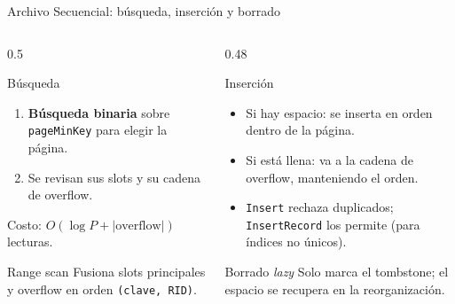 \documentclass[aspectratio=169,10pt]{beamer}
\begin{document}
\begin{frame}{Archivo Secuencial: búsqueda, inserción y borrado}
  \begin{columns}[T]
    \begin{column}{0.5\textwidth}
      \begin{block}{Búsqueda}
        \small
        \begin{enumerate}
          \item \textbf{Búsqueda binaria} sobre \texttt{pageMinKey} para elegir la página.
          \item Se revisan sus slots y su cadena de overflow.
        \end{enumerate}
        Costo: $O(\log P + |\text{overflow}|)$ lecturas.
      \end{block}
      \begin{block}{Range scan}
        \small Fusiona slots principales y overflow en orden \texttt{(clave, RID)}.
      \end{block}
    \end{column}
    \begin{column}{0.48\textwidth}
      \begin{block}{Inserción}
        \small
        \begin{itemize}
          \item Si hay espacio: se inserta en orden dentro de la página.
          \item Si está llena: va a la cadena de overflow, manteniendo el orden.
          \item \texttt{Insert} rechaza duplicados; \texttt{InsertRecord} los permite (para índices no únicos).
        \end{itemize}
      \end{block}
      \begin{block}{Borrado \emph{lazy}}
        \small Solo marca el tombstone; el espacio se recupera en la reorganización.
      \end{block}
    \end{column}
  \end{columns}
\end{frame}
\end{document}
